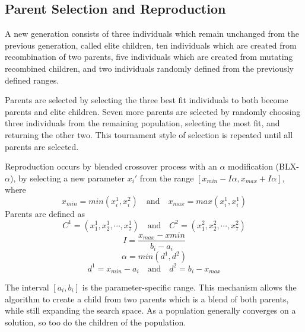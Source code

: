 \subsection{Parent Selection and Reproduction} A new generation consists of three individuals which remain
unchanged from the previous generation, called elite children, ten individuals which are created from
recombination of two parents, five individuals which are created from mutating recombined children, and two
individuals randomly defined from the previously defined ranges.

Parents are selected by selecting the three best fit individuals to both become parents and elite children.
Seven more parents are selected by randomly choosing three individuals from the remaining population,
selecting the most fit, and returning the other two. This tournament style of selection is repeated until all
parents are selected.

Reproduction occurs by blended crossover process with an $\alpha$ modification (BLX-$\alpha$), by selecting a
new parameter $x_i'$ from the range $[x_{min}-I\alpha,x_{max}+I\alpha]$, where \begin{displaymath}
x_{min}=min(x_i^1,x_i^2)\quad \mathrm{and} \quad x_{max}=max(x_i^1,x_i^1) \end{displaymath}
   Parents are defined as \begin{displaymath}
C^1=(x_1^1,x_2^1,\cdots,x_7^1)\quad\mathrm{and}\quad C^2=(x_1^2,x_2^2,\cdots,x_7^2) \end{displaymath}
  \begin{displaymath}
I=\frac{x_{max}-x{min}}{b_i-a_i} \end{displaymath} \begin{displaymath} \alpha=min(d^1,d^2) \end{displaymath}
\begin{displaymath} d^1=x_{min}-a_i\quad\mathrm{and}\quad d^2=b_i-x_{max} \end{displaymath}

The interval $[a_i,b_i]$ is the parameter-specific range. This mechanism allows the algorithm to create a
child from two parents which is a blend of both parents, while still expanding the search space. As a
population generally converges on a solution, so too do the children of the population.

